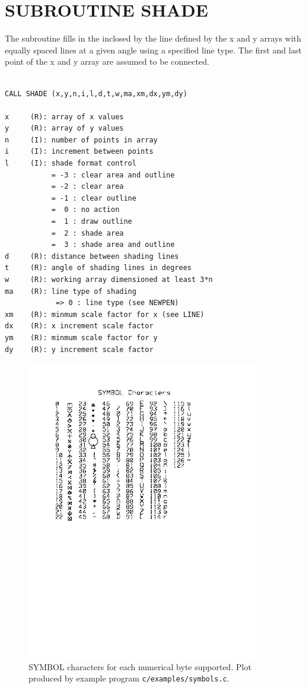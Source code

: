 \documentclass[11pt]{report}
\begin{document}
\section{SUBROUTINE SHADE}

The  subroutine fills in the  inclosed by the line
defined by the x and y arrays with equally spaced lines at a given
angle using a specified line type.  The first and last point of the x
and y array are assumed to be connected.
\begin{verbatim}

CALL SHADE (x,y,n,i,l,d,t,w,ma,xm,dx,ym,dy)

x     (R): array of x values
y     (R): array of y values
n     (I): number of points in array
i     (I): increment between points
l     (I): shade format control
           = -3 : clear area and outline
           = -2 : clear area
           = -1 : clear outline
           =  0 : no action
           =  1 : draw outline
           =  2 : shade area
           =  3 : shade area and outline
d     (R): distance between shading lines
t     (R): angle of shading lines in degrees
w     (R): working array dimensioned at least 3*n
ma    (R): line type of shading
            => 0 : line type (see NEWPEN)
xm    (R): minmum scale factor for x (see LINE)
dx    (R): x increment scale factor
ym    (R): minmum scale factor for y
dy    (R): y increment scale factor
\end{verbatim}

\begin{figure}[htb]
\centering
\includegraphics[width=4in]{figures/symbols0.jpg}
\vspace{-2.5in}
\caption{SYMBOL characters for each numerical byte supported. Plot produced by example program
{\tt c/examples/symbols.c}.
\label{fig:symbol}} 
\end{figure}
\end{document}
